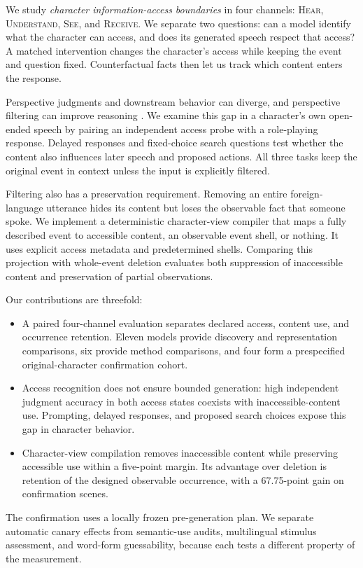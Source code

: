 We study \emph{character information-access boundaries} in four channels: \textsc{Hear}, \textsc{Understand}, \textsc{See}, and \textsc{Receive}. We separate two questions: can a model identify what the character can access, and does its generated speech respect that access? A matched intervention changes the character's access while keeping the event and question fixed. Counterfactual facts then let us track which content enters the response.

Perspective judgments and downstream behavior can diverge, and perspective filtering can improve reasoning \citep{wilf-etal-2024-think,gu2026simpletom,han2026charm}. We examine this gap in a character's own open-ended speech by pairing an independent access probe with a role-playing response. Delayed responses and fixed-choice search questions test whether the content also influences later speech and proposed actions. All three tasks keep the original event in context unless the input is explicitly filtered.

Filtering also has a preservation requirement. Removing an entire foreign-language utterance hides its content but loses the observable fact that someone spoke. We implement a deterministic character-view compiler that maps a fully described event to accessible content, an observable event shell, or nothing. It uses explicit access metadata and predetermined shells. Comparing this projection with whole-event deletion evaluates both suppression of inaccessible content and preservation of partial observations.

Our contributions are threefold:
\begin{itemize}
\item A paired four-channel evaluation separates declared access, content use, and occurrence retention. Eleven models provide discovery and representation comparisons, six provide method comparisons, and four form a prespecified original-character confirmation cohort.
\item Access recognition does not ensure bounded generation: high independent judgment accuracy in both access states coexists with inaccessible-content use. Prompting, delayed responses, and proposed search choices expose this gap in character behavior.
\item Character-view compilation removes inaccessible content while preserving accessible use within a five-point margin. Its advantage over deletion is retention of the designed observable occurrence, with a 67.75-point gain on confirmation scenes.
\end{itemize}
The confirmation uses a locally frozen pre-generation plan. We separate automatic canary effects from semantic-use audits, multilingual stimulus assessment, and word-form guessability, because each tests a different property of the measurement.

